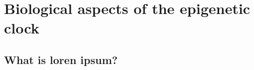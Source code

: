 
\chapter{Biological aspects of the epigenetic clock}  

\ifpdf
    \graphicspath{{Chapter3/Figs/Raster/}{Chapter3/Figs/PDF/}{Chapter3/Figs/}}
\else
    \graphicspath{{Chapter3/Figs/Vector/}{Chapter3/Figs/}}
\fi


\section{What is loren ipsum? } 



